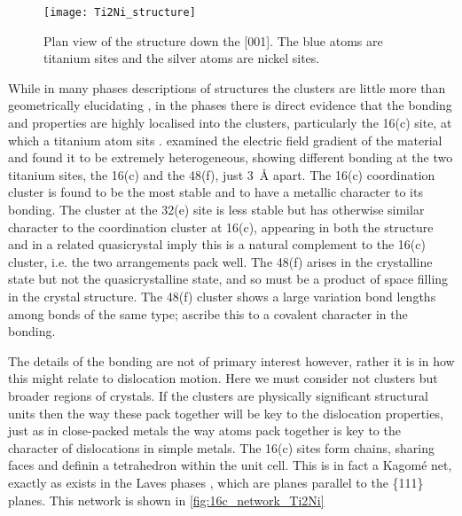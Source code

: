 \begin{figure}[h]
\centering
\texttt{[image: Ti2Ni\_structure]}
\caption{Plan view of the  structure down the [001]. The blue atoms are titanium sites and the silver atoms are nickel sites.\label{fig:Ti2Ni_plan}}
\end{figure}



While in many phases descriptions of structures the clusters are little more than geometrically elucidating \cite{Steurer2006}, in the  phases there is direct evidence that the bonding and properties are highly localised into the clusters, particularly the 16(c) site, at which a titanium atom sits \cite{Ivanovic2006}. \citet{Ivanovic2006} examined the electric field gradient of the material and found it to be extremely heterogeneous, showing different bonding at the two titanium sites, the 16(c) and the 48(f), just \SI{3}{\angstrom} apart. The 16(c) coordination cluster is found to be the most stable and to have a metallic character to its bonding. The cluster at the 32(e) site is less stable but has otherwise similar character to the coordination cluster at 16(c), appearing in both the  structure and in a related quasicrystal imply this is a natural complement to the 16(c) cluster, i.e. the two arrangements pack well. The 48(f) arises in the crystalline state but not the quasicrystalline state, and so must be a product of space filling in the  crystal structure. The 48(f) cluster shows a large variation bond lengths among bonds of the same type; \citet{Ivanovic2006} ascribe this to a covalent character in the bonding.


The details of the bonding are not of primary interest however, rather it is in how this might relate to dislocation motion. Here we must consider not clusters but broader regions of crystals. If the clusters are physically significant structural units then the way these pack together will be key to the dislocation properties, just as in close-packed metals the way atoms pack together is key to the character of dislocations in simple metals. The 16(c) sites form chains, sharing faces and definin a tetrahedron within the unit cell. This is in fact a Kagom\'{e} net, exactly as exists in the Laves phases \cite{Stein2004,Stein2005}, which are planes parallel to the \{111\} planes. This network is shown in \autoref{fig:16c_network_Ti2Ni}

